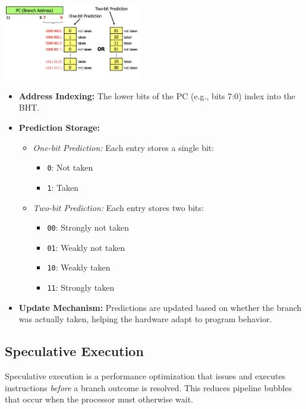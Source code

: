 \begin{center}
    \includegraphics[width=0.45\textwidth]{chapters/chapter4f/images/bht.png}
\end{center}

\begin{itemize}
    \item \textbf{Address Indexing:} The lower bits of the PC (e.g., bits 7:0) index into the BHT.
    \item \textbf{Prediction Storage:}
    \begin{itemize}
        \item \emph{One-bit Prediction:} Each entry stores a single bit:
              \begin{itemize}
                \item \texttt{0}: Not taken
                \item \texttt{1}: Taken
              \end{itemize}
        \item \emph{Two-bit Prediction:} Each entry stores two bits:
              \begin{itemize}
                \item \texttt{00}: Strongly not taken
                \item \texttt{01}: Weakly not taken
                \item \texttt{10}: Weakly taken
                \item \texttt{11}: Strongly taken
              \end{itemize}
    \end{itemize}
    \item \textbf{Update Mechanism:} Predictions are updated based on whether the branch was actually taken, helping the hardware adapt to program behavior.
\end{itemize}

\subsection{Speculative Execution}
Speculative execution is a performance optimization that issues and executes instructions \emph{before} a branch outcome is resolved. This reduces pipeline bubbles that occur when the processor must otherwise wait.

